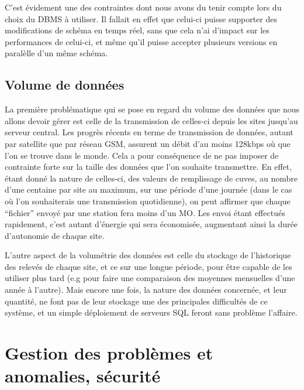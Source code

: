 C'est évidement une des contraintes dont nous avons du tenir compte lors du choix du DBMS à utiliser. Il fallait en effet que celui-ci puisse supporter des modifications de schéma en temps réel, sans que cela n'ai d'impact sur les performances de celui-ci, et même qu'il puisse accepter plusieurs versions en paralèlle d'un même schéma.

\subsection{Volume de données}

La première problématique qui se pose en regard du volume des données que nous allons devoir gérer est celle de la transmission de celles-ci depuis les sites jusqu'au serveur central. Les progrès récents en terme de transmission de données, autant par satellite que par réseau GSM, assurent un débit d'au moins 128kbps où que l'on se trouve dans le monde. Cela a pour conséquence de ne pas imposer de contrainte forte sur la taille des données que l'on souhaite transmettre. En effet, étant donné la nature de celles-ci, des valeurs de remplissage de cuves, au nombre d'une centaine par site au maximum, sur une période d'une journée (dans le cas où l'on souhaiterais une transmission quotidienne), on peut affirmer que chaque ``fichier'' envoyé par une station fera moins d'un MO. Les envoi étant effectués rapidement, c'est autant d'énergie qui sera économisée, augmentant ainsi la durée d'autonomie de chaque site.

L'autre aspect de la volumétrie des données est celle du stockage de l'historique des relevés de chaque site, et ce sur une longue période, pour être capable de les utiliser plus tard (e.g pour faire une comparaison des moyennes mensuelles d'une année à l'autre). Mais encore une fois, la nature des données concernée, et leur quantité, ne font pas de leur stockage une des principales difficultés de ce système, et un simple déploiement de serveurs SQL feront sans problème l'affaire.

\section{Gestion des problèmes et anomalies, sécurité}

